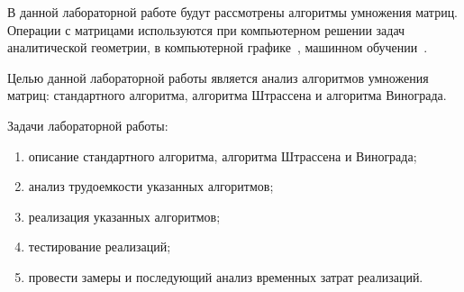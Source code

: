 
В данной лабораторной работе будут рассмотрены алгоритмы умножения матриц. Операции с матрицами используются при компьютерном решении задач аналитической геометрии, в компьютерной графике~\cite{Rogers89}, машинном обучении~\cite{Demidenko81, Merkov14}.

Целью данной лабораторной работы является анализ алгоритмов умножения матриц: стандартного алгоритма, алгоритма Штрассена и алгоритма Винограда.

Задачи лабораторной работы:
\begin{enumerate}[label={\arabic*)}]
	\item описание стандартного алгоритма, алгоритма Штрассена и Винограда;
	\item анализ трудоемкости указанных алгоритмов;
	\item реализация указанных алгоритмов;
	\item тестирование реализаций;
	\item провести замеры и последующий анализ временных затрат реализаций.
\end{enumerate}
\clearpage